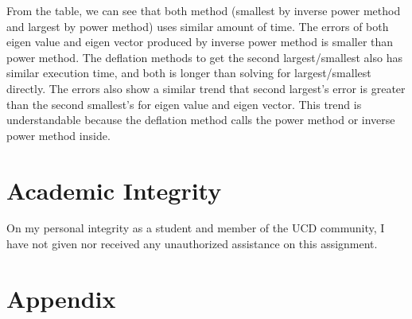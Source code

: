 \documentclass[a4paper,12pt]{article}
\begin{document}
From the table, we can see that both method (smallest by inverse power method and largest by power method)
uses similar amount of time.
The errors of both eigen value and eigen vector produced by inverse power method is smaller than power method.
The deflation methods to get the second largest/smallest also has similar execution time,
and both is longer than solving for largest/smallest directly.
The errors also show a similar trend that second largest's error is greater than the second smallest's for
eigen value and eigen vector.
This trend is understandable because the deflation method calls the power method or inverse power method inside.



\section{Academic Integrity}
On my personal integrity as a student and member of the UCD community, I have not given nor received any unauthorized assistance on this assignment.


\section{Appendix}




\end{document}
